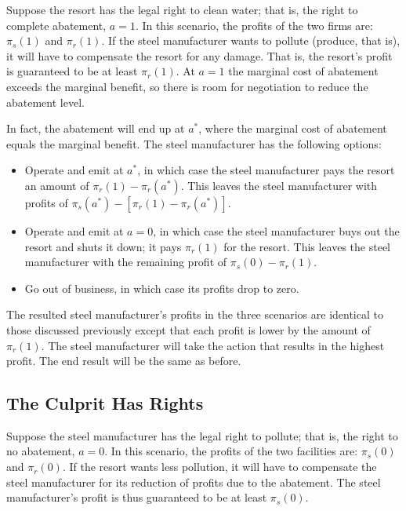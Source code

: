 \documentclass[
]{book}
\providecommand{\tightlist}{%
  \setlength{\itemsep}{0pt}\setlength{\parskip}{0pt}}
\begin{document}
Suppose the resort has the legal right to clean water; that is, the right to complete abatement, \(a=1\). In this scenario, the profits of the two firms are: \(\pi_s(1)\) and \(\pi_r(1)\). If the steel manufacturer wants to pollute (produce, that is), it will have to compensate the resort for any damage. That is, the resort's profit is guaranteed to be at least \(\pi_r(1)\). At \(a=1\) the marginal cost of abatement exceeds the marginal benefit, so there is room for negotiation to reduce the abatement level.

In fact, the abatement will end up at \(a^*\), where the marginal cost of abatement equals the marginal benefit. The steel manufacturer has the following options:

\begin{itemize}
\tightlist
\item
  Operate and emit at \(a^*\), in which case the steel manufacturer pays the resort an amount of \(\pi_r(1)-\pi_r(a^*)\). This leaves the steel manufacturer with profits of \(\pi_s(a^*)-[\pi_r(1)-\pi_r(a^*)]\).
\item
  Operate and emit at \(a=0\), in which case the steel manufacturer buys out the resort and shuts it down; it pays \(\pi_r(1)\) for the resort. This leaves the steel manufacturer with the remaining profit of \(\pi_s(0)-\pi_r(1)\).
\item
  Go out of business, in which case its profits drop to zero.
\end{itemize}

The resulted steel manufacturer's profits in the three scenarios are identical to those discussed previously except that each profit is lower by the amount of \(\pi_r(1)\). The steel manufacturer will take the action that results in the highest profit. The end result will be the same as before.

\hypertarget{the-culprit-has-rights}{%
\subsection{The Culprit Has Rights}\label{the-culprit-has-rights}}

Suppose the steel manufacturer has the legal right to pollute; that is, the right to no abatement, \(a=0\). In this scenario, the profits of the two facilities are: \(\pi_s(0)\) and \(\pi_r(0)\). If the resort wants less pollution, it will have to compensate the steel manufacturer for its reduction of profits due to the abatement. The steel manufacturer's profit is thus guaranteed to be at least \(\pi_s(0)\).
\end{document}
